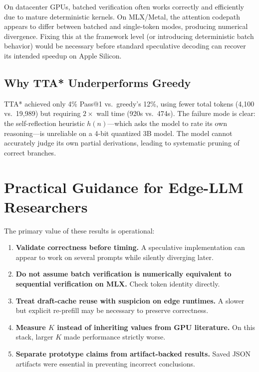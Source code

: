 \documentclass[11pt]{article}
\begin{document}
On datacenter GPUs, batched verification often works correctly and efficiently due to mature deterministic kernels. On MLX/Metal, the attention codepath appears to differ between batched and single-token modes, producing numerical divergence. Fixing this at the framework level (or introducing deterministic batch behavior) would be necessary before standard speculative decoding can recover its intended speedup on Apple Silicon.

\subsection{Why TTA* Underperforms Greedy}

TTA* achieved only 4\% Pass@1 vs.\ greedy's 12\%, using fewer total tokens (4,100 vs.\ 19,989) but requiring $2\times$ wall time (920s vs.\ 474s). The failure mode is clear: the self-reflection heuristic $h(n)$---which asks the model to rate its own reasoning---is unreliable on a 4-bit quantized 3B model. The model cannot accurately judge its own partial derivations, leading to systematic pruning of correct branches.

\section{Practical Guidance for Edge-LLM Researchers}

The primary value of these results is operational:

\begin{enumerate}
    \item \textbf{Validate correctness before timing.} A speculative implementation can appear to work on several prompts while silently diverging later.
    \item \textbf{Do not assume batch verification is numerically equivalent to sequential verification on MLX.} Check token identity directly.
    \item \textbf{Treat draft-cache reuse with suspicion on edge runtimes.} A slower but explicit re-prefill may be necessary to preserve correctness.
    \item \textbf{Measure $K$ instead of inheriting values from GPU literature.} On this stack, larger $K$ made performance strictly worse.
    \item \textbf{Separate prototype claims from artifact-backed results.} Saved JSON artifacts were essential in preventing incorrect conclusions.
\end{enumerate}
\end{document}
